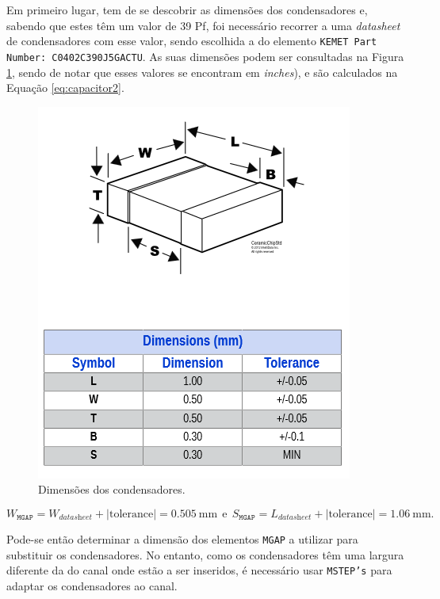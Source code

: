 \documentclass[11pt]{article}
\numberwithin{equation}{section}
\begin{document}
Em primeiro lugar, tem de se descobrir as dimensões dos condensadores e, sabendo que estes têm um valor de 39 Pf, foi necessário recorrer a uma \textit{datasheet} de condensadores com esse valor, sendo escolhida a do elemento \texttt{KEMET Part Number: C0402C390J5GACTU}. As suas dimensões podem ser consultadas na Figura \ref{fig:capacitor}, sendo de notar que esses valores se encontram em \textit{inches}), e são calculados na Equação \ref{eq:capacitor2}.

\begin{figure}[H]
	\centering
	\includegraphics[keepaspectratio=true, scale=0.45]{teoricas/capacitor}
	\vspace{-0.5em}
	\caption{Dimensões dos condensadores.}
	\vspace{-9mm}
	\label{fig:capacitor}
\end{figure}

\vspace{-3mm}
\begin{equation}
	W_{\texttt{MGAP}} = W_{\textit{datasheet}} + \lvert\text{tolerance}\rvert = 0.505~\text{mm} ~~ \text{e} ~~ S_{\texttt{MGAP}} = L_{\textit{datasheet}} + \lvert\text{tolerance}\rvert = 1.06~\text{mm}.
	\label{eq:capacitor2}
\end{equation}

\vspace{-1mm}
Pode-se então determinar a dimensão dos elementos \texttt{MGAP} a utilizar para substituir os condensadores. No entanto, como os condensadores têm uma largura diferente da do canal onde estão a ser inseridos, é necessário usar \texttt{MSTEP's} para adaptar os condensadores ao canal.
\end{document}
